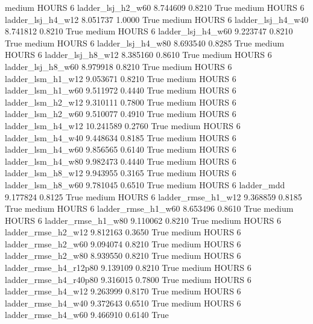     medium    HOURS                 6      ladder_lsj_h2_w60   8.744609      0.8210    True
    medium    HOURS                 6      ladder_lsj_h4_w12   8.051737      1.0000    True
    medium    HOURS                 6      ladder_lsj_h4_w40   8.741812      0.8210    True
    medium    HOURS                 6      ladder_lsj_h4_w60   9.223747      0.8210    True
    medium    HOURS                 6      ladder_lsj_h4_w80   8.693540      0.8285    True
    medium    HOURS                 6      ladder_lsj_h8_w12   8.385160      0.8610    True
    medium    HOURS                 6      ladder_lsj_h8_w60   8.979918      0.8210    True
    medium    HOURS                 6      ladder_lsm_h1_w12   9.053671      0.8210    True
    medium    HOURS                 6      ladder_lsm_h1_w60   9.511972      0.4440    True
    medium    HOURS                 6      ladder_lsm_h2_w12   9.310111      0.7800    True
    medium    HOURS                 6      ladder_lsm_h2_w60   9.510077      0.4910    True
    medium    HOURS                 6      ladder_lsm_h4_w12  10.241589      0.2760    True
    medium    HOURS                 6      ladder_lsm_h4_w40   9.448634      0.8185    True
    medium    HOURS                 6      ladder_lsm_h4_w60   9.856565      0.6140    True
    medium    HOURS                 6      ladder_lsm_h4_w80   9.982473      0.4440    True
    medium    HOURS                 6      ladder_lsm_h8_w12   9.943955      0.3165    True
    medium    HOURS                 6      ladder_lsm_h8_w60   9.781045      0.6510    True
    medium    HOURS                 6             ladder_mdd   9.177824      0.8125    True
    medium    HOURS                 6     ladder_rmse_h1_w12   9.368859      0.8185    True
    medium    HOURS                 6     ladder_rmse_h1_w60   8.653496      0.8610    True
    medium    HOURS                 6     ladder_rmse_h1_w80   9.110062      0.8210    True
    medium    HOURS                 6     ladder_rmse_h2_w12   9.812163      0.3650    True
    medium    HOURS                 6     ladder_rmse_h2_w60   9.094074      0.8210    True
    medium    HOURS                 6     ladder_rmse_h2_w80   8.939550      0.8210    True
    medium    HOURS                 6  ladder_rmse_h4_r12p80   9.139109      0.8210    True
    medium    HOURS                 6  ladder_rmse_h4_r40p80   9.316015      0.7800    True
    medium    HOURS                 6     ladder_rmse_h4_w12   9.263999      0.8170    True
    medium    HOURS                 6     ladder_rmse_h4_w40   9.372643      0.6510    True
    medium    HOURS                 6     ladder_rmse_h4_w60   9.466910      0.6140    True
